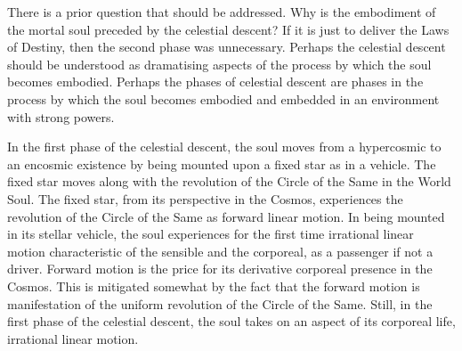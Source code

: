 There is a prior question that should be addressed. Why is the embodiment of the mortal soul preceded by the celestial descent? If it is just to deliver the Laws of Destiny, then the second phase was unnecessary. Perhaps the celestial descent should be understood as dramatising aspects of the process by which the soul becomes embodied. Perhaps the phases of celestial descent are phases in the process by which the soul becomes embodied and embedded in an environment with strong powers. 

In the first phase of the celestial descent, the soul moves from a hypercosmic to an encosmic existence by being mounted upon a fixed star as in a vehicle. The fixed star moves along with the revolution of the Circle of the Same in the World Soul. The fixed star, from its perspective in the Cosmos, experiences the revolution of the Circle of the Same as forward linear motion. In being mounted in its stellar vehicle, the soul experiences for the first time irrational linear motion characteristic of the sensible and the corporeal, as a passenger if not a driver. Forward motion is the price for its derivative corporeal presence in the Cosmos. This is mitigated somewhat by the fact that the forward motion is manifestation of the uniform revolution of the Circle of the Same. Still, in the first phase of the celestial descent, the soul takes on an aspect of its corporeal life, irrational linear motion. 

